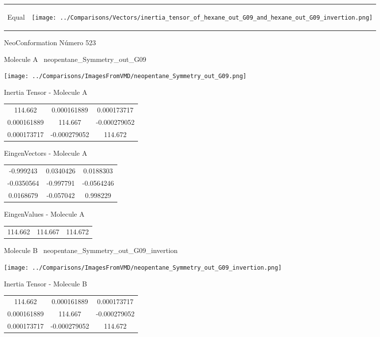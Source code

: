\vtab[-5mm]
\begin{tabular}{*{2}{m{}}}
\begin{center}
\textcolor{NavyBlue}{\Large Equal}
\end{center}
&
\begin{center}
\texttt{[image: ../Comparisons/Vectors/inertia\_tensor\_of\_hexane\_out\_G09\_and\_hexane\_out\_G09\_invertion.png]}
\end{center}
\end{tabular}

 \newpage

\vtab[-3cm]
\begin{center}
{\large NeoConformation \tab Número 523}
\end{center}
\begin{multicols}{2}
\begin{center}

Molecule A \
neopentane\_Symmetry\_out\_G09

\texttt{[image: ../Comparisons/ImagesFromVMD/neopentane\_Symmetry\_out\_G09.png]}

Inertia Tensor - Molecule A \\
\begin{tabular}{|c c c|}
114.662	 & 	0.000161889	 & 	0.000173717	 \\
0.000161889	 & 	114.667	 & 	-0.000279052	 \\
0.000173717	 & 	-0.000279052	 & 	114.672
\end{tabular}

\vtab
 EingenVectors - Molecule A     \\
\begin{tabular}{|c c c|}
-0.999243	 & 	0.0340426	 & 	0.0188303	 \\
-0.0350564	 & 	-0.997791	 & 	-0.0564246	 \\
0.0168679	 & 	-0.057042	 & 	0.998229
\end{tabular}

\vtab
 EingenValues - Molecule A     \\
\begin{tabular}{|c c c|}
114.662	 & 	114.667	 & 	114.672	 \\
\end{tabular}
\columnbreak

Molecule B \
neopentane\_Symmetry\_out\_G09\_invertion

\texttt{[image: ../Comparisons/ImagesFromVMD/neopentane\_Symmetry\_out\_G09\_invertion.png]}

Inertia Tensor - Molecule B \\
\begin{tabular}{|c c c|}
114.662	 & 	0.000161889	 & 	0.000173717	 \\
0.000161889	 & 	114.667	 & 	-0.000279052	 \\
0.000173717	 & 	-0.000279052	 & 	114.672
\end{tabular}


\end{center}
\end{multicols}
